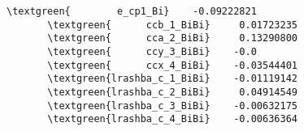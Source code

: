 \documentclass[a4paper,12pt]{scrartcl}
\newcommand{\textgreen}[1]{\textcolor{green!50!black}{\texttt{#1}}}
\begin{document}
\begin{description}
\begin{Verbatim}[commandchars=\\\{\},gobble=4, frame=single, framesep=2mm, 
    label= example of PFILE: PARAM\_FIT.dat for MoS$_2$ (IS\_SK  .TRUE.),
    labelposition=bottomline]
\end{Verbatim}

\begin{Verbatim}[commandchars=\\\{\},gobble=4, frame=single, framesep=2mm, 
    label= example of PFILE: PARAM\_FIT.dat for Bi/Si(110) (IS\_SK  .FALSE.),
    labelposition=bottomline]
       \textgreen{        e_cp1_Bi}    -0.09222821  
       \textgreen{      ccb_1_BiBi}     0.01723235  
       \textgreen{      cca_2_BiBi}     0.13290800  
       \textgreen{      ccy_3_BiBi}    -0.0         
       \textgreen{      ccx_4_BiBi}    -0.03544401  
       \textgreen{lrashba_c_1_BiBi}    -0.01119142  
       \textgreen{lrashba_c_2_BiBi}     0.04914549  
       \textgreen{lrashba_c_3_BiBi}    -0.00632175  
       \textgreen{lrashba_c_4_BiBi}    -0.00636364  

\end{Verbatim}
	

\end{description}
\end{document}
